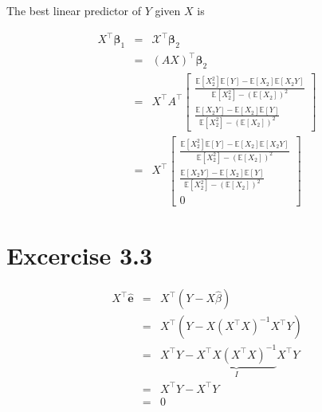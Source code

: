 \documentclass{article}
\begin{document}
The best linear predictor of $Y$ given $X$ is

\begin{eqnarray*}
X^{\intercal }\mathbf{\beta }_{1} &=&\mathcal{X}^{\intercal }\mathbf{\beta }%
_{2} \\
&=&\left( AX\right) ^{\intercal }\mathbf{\beta }_{2} \\
&=&X^{\intercal }A^{\intercal }\left[ 
\begin{array}{c}
\frac{\mathbb{E}\left[ X_{2}^{2}\right] \mathbb{E}\left[ Y\right] -\mathbb{E}%
\left[ X_{2}\right] \mathbb{E}\left[ X_{2}Y\right] }{\mathbb{E}\left[
X_{2}^{2}\right] -\left( \mathbb{E}\left[ X_{2}\right] \right) ^{2}} \\ 
\frac{\mathbb{E}\left[ X_{2}Y\right] -\mathbb{E}\left[ X_{2}\right] \mathbb{E%
}\left[ Y\right] }{\mathbb{E}\left[ X_{2}^{2}\right] -\left( \mathbb{E}\left[
X_{2}\right] \right) ^{2}}%
\end{array}%
\right] \\
&=&X^{\intercal }\left[ 
\begin{array}{c}
\frac{\mathbb{E}\left[ X_{2}^{2}\right] \mathbb{E}\left[ Y\right] -\mathbb{E}%
\left[ X_{2}\right] \mathbb{E}\left[ X_{2}Y\right] }{\mathbb{E}\left[
X_{2}^{2}\right] -\left( \mathbb{E}\left[ X_{2}\right] \right) ^{2}} \\ 
\frac{\mathbb{E}\left[ X_{2}Y\right] -\mathbb{E}\left[ X_{2}\right] \mathbb{E%
}\left[ Y\right] }{\mathbb{E}\left[ X_{2}^{2}\right] -\left( \mathbb{E}\left[
X_{2}\right] \right) ^{2}} \\ 
0%
\end{array}%
\right]
\end{eqnarray*}

\section*{Excercise 3.3}

\begin{eqnarray*}
X^{\intercal }\mathbf{\hat{e}} &\mathbf{=}&X^{\intercal }\left( Y-X\hat{\beta%
}\right) \\
&=&X^{\intercal }\left( Y-X\left( X^{\intercal }X\right) ^{-1}X^{\intercal
}Y\right) \\
&=&X^{\intercal }Y-\underset{I}{\underbrace{X^{\intercal }X\left(
X^{\intercal }X\right) ^{-1}}}X^{\intercal }Y \\
&=&X^{\intercal }Y-X^{\intercal }Y \\
&=&0
\end{eqnarray*}
\end{document}
